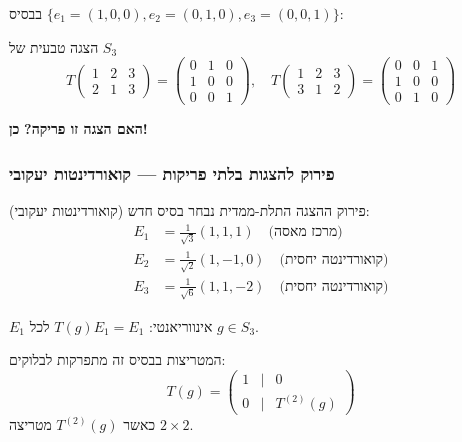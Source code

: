 בבסיס $\{e_1 = (1,0,0), e_2 = (0,1,0), e_3 = (0,0,1)\}$:

\begin{examplebox}{הצגה טבעית של $S_3$}
\[
T\begin{pmatrix} 1 & 2 & 3 \\ 2 & 1 & 3 \end{pmatrix} = 
\begin{pmatrix} 0 & 1 & 0 \\ 1 & 0 & 0 \\ 0 & 0 & 1 \end{pmatrix}, \quad
T\begin{pmatrix} 1 & 2 & 3 \\ 3 & 1 & 2 \end{pmatrix} = 
\begin{pmatrix} 0 & 0 & 1 \\ 1 & 0 & 0 \\ 0 & 1 & 0 \end{pmatrix}
\]
\end{examplebox}

\textbf{האם הצגה זו פריקה?} \textbf{כן!}

\subsubsection{פירוק להצגות בלתי פריקות — קואורדינטות יעקובי}

\begin{importantbox}{פירוק ההצגה התלת-ממדית}
נבחר בסיס חדש (קואורדינטות יעקובי):
\begin{align*}
E_1 &= \frac{1}{\sqrt{3}}(1, 1, 1) \quad \text{(מרכז מאסה)} \\
E_2 &= \frac{1}{\sqrt{2}}(1, -1, 0) \quad \text{(קואורדינטה יחסית)} \\
E_3 &= \frac{1}{\sqrt{6}}(1, 1, -2) \quad \text{(קואורדינטה יחסית)}
\end{align*}

$E_1$ אינווריאנטי: $T(g) E_1 = E_1$ לכל $g \in S_3$.

המטריצות בבסיס זה מתפרקות לבלוקים:
\[
T(g) = \begin{pmatrix} 1 & \mid & 0 \\ \hline 0 & \mid & T^{(2)}(g) \end{pmatrix}
\]
כאשר $T^{(2)}(g)$ מטריצה $2 \times 2$.
\end{importantbox}

